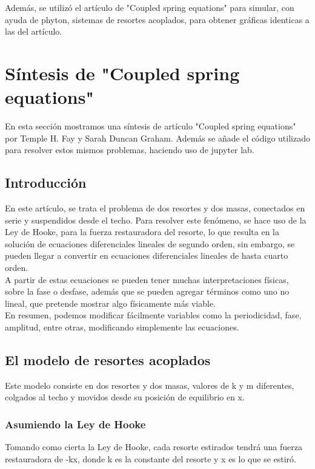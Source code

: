 \documentclass[12pt]{article}
\begin{document}
Además, se utilizó el artículo de "Coupled spring equations" para simular, con ayuda de phyton, sistemas de resortes acoplados, para obtener gráficas identicas a las del artículo. 

\section{Síntesis de "Coupled spring equations"}

En esta sección mostramos una síntesis de artículo "Coupled spring equations" por Temple H. Fay y Sarah Duncan Graham. Además se añade el código utilizado para resolver estos mismos problemas, haciendo uso de jupyter lab.

\subsection{Introducción}
En este artículo, se trata el problema de dos resortes y dos masas, conectados en serie y suspendidos desde el techo. Para resolver este fenómeno, se hace uso de la Ley de Hooke, para la fuerza restauradora del resorte, lo que resulta en la solución de ecuaciones diferenciales lineales de segundo orden, sin embargo, se pueden llegar a convertir en ecuaciones diferenciales lineales de hasta cuarto orden.\\ 

A partir de estas ecuaciones se pueden tener muchas interpretaciones físicas, sobre la fase o desfase, además que se pueden agregar términos como uno no lineal, que pretende mostrar algo físicamente más viable. \\

En resumen, podemos modificar fácilmente variables como la periodicidad, fase, amplitud, entre otras, modificando simplemente las ecuaciones.

\subsection{El modelo de resortes acoplados}

Este modelo consiste en dos resortes y dos masas, valores de k y m diferentes, colgados al techo y movidos desde su posición de equilibrio en x. 

\subsubsection{Asumiendo la Ley de Hooke}

Tomando como cierta la Ley de Hooke, cada resorte estirados tendrá una fuerza restauradora de -kx, donde k es la constante del resorte y x es lo que se estiró. 
\end{document}
